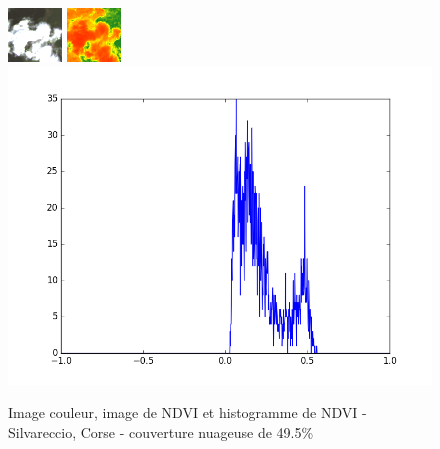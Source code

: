 \documentclass{book}
\begin{document}
\begin{figure}[H]
\begin{center}
    \includegraphics[scale=1.80]{../5_diaporama/images/Silvareccio/08_rgb.png}
    \includegraphics[scale=1.80]{../5_diaporama/images/Silvareccio/08_ndvi.png}
    \includegraphics[scale=0.21]{../5_diaporama/images/Silvareccio/08_ndvi_histo.png}
\end{center}
\caption{Image couleur, image de NDVI et histogramme de NDVI - Silvareccio, Corse - couverture nuageuse de 49.5\%}
\label{Silvareccio}
\end{figure}
 
\end{document}
